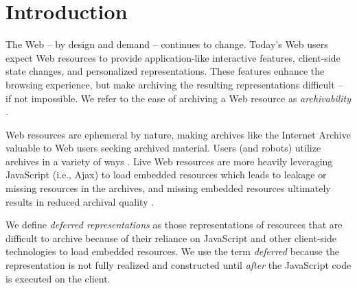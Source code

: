 \documentclass{sig-alternate}
\begin{document}



\section{Introduction}
\label{introduction}
The Web -- by design and demand -- continues to change. Today's Web users expect Web resources to provide application-like interactive features, client-side state changes, and personalized representations. These features enhance the browsing experience, but make archiving the resulting representations difficult -- if not impossible. We refer to the ease of archiving a Web resource as \emph{archivability} \cite{ijdl}. 


Web resources are ephemeral by nature, making archives like the Internet Archive \cite{iawebarchive, waybackarchives2} valuable to Web users seeking archived material. Users (and robots) utilize archives in a variety of ways \cite{usingIA, marshalls_social_media_study, yasminLinks}. Live Web resources are more heavily leveraging JavaScript (i.e., Ajax) to load embedded resources which leads to leakage \cite{zombies} or missing resources in the archives, and missing embedded resources ultimately results in reduced archival quality \cite{brunelleDamage}.

We define \emph{deferred representations} as those representations of resources that are difficult to archive because of their reliance on JavaScript and other client-side technologies to load embedded resources. We use the term \emph{deferred} because the representation is not fully realized and constructed until \emph{after} the JavaScript code is executed on the client. 
\end{document}
